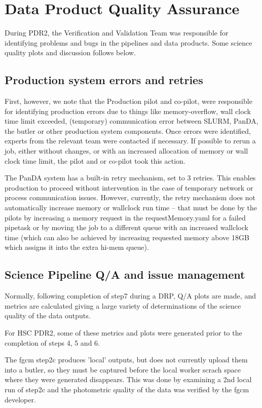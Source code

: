 \section{Data Product Quality Assurance} \label{sec:qa}

During PDR2, the Verification and Validation Team was responsible 
for identifying problems and bugs in the pipelines and data products. 
Some science quality plots and discussion follows below.

\subsection{Production system errors and retries}

First, however, we note that the Production pilot and co-pilot, 
were responsible for identifying production errors due to things 
like memory-overflow, wall clock time limit exceeded, 
(temporary) communication error between SLURM, PanDA, the butler or other 
production system components.  Once errors were
identified, experts from the relevant team were contacted if necessary.
If possible to rerun a job, either without changes, or with an
increased allocation of memory or wall clock time limit, the pilot and
or co-pilot took this action.

The PanDA system has a built-in retry mechanism, set to 3 retries.  This
enables production to proceed without intervention in the case of
temporary network or process communication issues. However,
currently, the retry mechanism does not automatically increase memory
or wallclock run time -- that must be done by the pilots by increasing
a memory request in the requestMemory.yaml for a failed pipetask or
by moving the job to a different queue with an increased wallclock time
(which can also be achieved by increasing requested memory above 18GB which
assigns it into the extra hi-mem queue).

\subsection{Science Pipeline Q/A and issue management}

Normally, following completion of step7 during a DRP, Q/A plots are made,
and metrics are calculated giving a large variety of determinations of
the science quality of the data outputs.

For HSC PDR2, some of these metrics and plots were generated prior to 
the completion of steps 4, 5 and 6.

The fgcm step2c produces 'local' outputs, but does not currently upload them 
into a butler, so they must be captured before the local worker scrach space where they were
generated disappears.  This was done by examining a 2nd local run of step2c and the 
photometric quality of the
data was verified by the fgcm developer.
 
